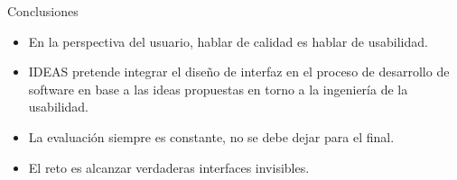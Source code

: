 \documentclass{beamer}
\begin{document}
\begin{frame}{Conclusiones}
 \begin{itemize}
  \item En la perspectiva del usuario, hablar de calidad es hablar de usabilidad.
  \item IDEAS pretende integrar el diseño de interfaz en el proceso de desarrollo de software en base a las ideas propuestas
  en torno a la ingeniería de la usabilidad.
  \item La evaluación siempre es constante, no se debe dejar para el final.
  \item El reto es alcanzar verdaderas interfaces invisibles.
 \end{itemize}
\end{frame}
\end{document}

